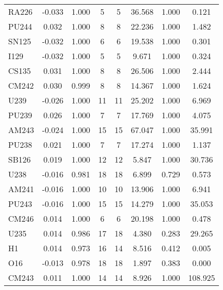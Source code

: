 \begin{tabular}{|l|ccccccc|}
RA226 & -0.033 & 1.000 & 5 & 5 & 36.568 & 1.000 & 0.121\\
PU244 & 0.032 & 1.000 & 8 & 8 & 22.236 & 1.000 & 1.482\\
SN125 & -0.032 & 1.000 & 6 & 6 & 19.538 & 1.000 & 0.301\\
I129 & -0.032 & 1.000 & 5 & 5 & 9.671 & 1.000 & 0.324\\
CS135 & 0.031 & 1.000 & 8 & 8 & 26.506 & 1.000 & 2.444\\
CM242 & 0.030 & 0.999 & 8 & 8 & 14.367 & 1.000 & 1.624\\
U239 & -0.026 & 1.000 & 11 & 11 & 25.202 & 1.000 & 6.969\\
PU239 & 0.026 & 1.000 & 7 & 7 & 17.769 & 1.000 & 4.075\\
AM243 & -0.024 & 1.000 & 15 & 15 & 67.047 & 1.000 & 35.991\\
PU238 & 0.021 & 1.000 & 7 & 7 & 17.274 & 1.000 & 1.137\\
SB126 & 0.019 & 1.000 & 12 & 12 & 5.847 & 1.000 & 30.736\\
U238 & -0.016 & 0.981 & 18 & 18 & 6.899 & 0.729 & 0.573\\
AM241 & -0.016 & 1.000 & 10 & 10 & 13.906 & 1.000 & 6.941\\
PU243 & -0.016 & 1.000 & 15 & 15 & 14.279 & 1.000 & 35.053\\
CM246 & 0.014 & 1.000 & 6 & 6 & 20.198 & 1.000 & 0.478\\
U235 & 0.014 & 0.986 & 17 & 18 & 4.380 & 0.283 & 29.265\\
H1 & 0.014 & 0.973 & 16 & 14 & 8.516 & 0.412 & 0.005\\
O16 & -0.013 & 0.978 & 18 & 18 & 1.897 & 0.383 & 0.000\\
CM243 & 0.011 & 1.000 & 14 & 14 & 8.926 & 1.000 & 108.925\\
\hline
\end{tabular}
